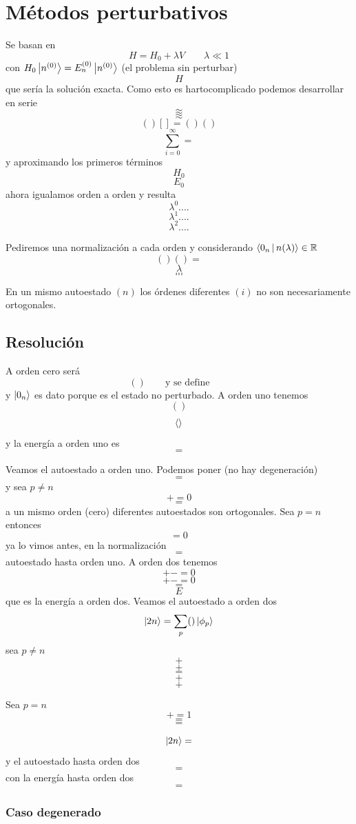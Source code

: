 \documentclass[10pt,oneside]{CBFT_book}
\begin{document}
\chapter{Métodos perturbativos}

Se basan en 
\[
	H = H_0 + \lambda V \qquad \lambda \ll 1
\]
con $ H_0\Ket{n^{(0)}} = E_n^{(0)}\Ket{n^{(0)}}$ (el problema sin perturbar)
\[
	H
\]
que sería la solución exacta.
Como esto es hartocomplicado podemos desarrollar en serie 
\[
	\approx 
\]
\[
	\approx 
\]
\[
	()[] = ()()
\]
\[
	\sum_{i=0}^\infty =
\]
y aproximando los primeros términos 
\[
	H_0
\]
\[
	E_0
\]
ahora igualamos orden a orden y resulta 
\[
	\lambda^0 ....
\]
\[
	\lambda^1 ....
\]
\[
	\lambda^2 ....
\]

Pediremos una normalización a cada orden y considerando $ \Braket{0_n|n(\lambda)} \in \mathbb{R}$
\[
	()() =
\]
\[
	\lambda
\]
\[
	...
\]
\[
	...
\]

En un mismo autoestado $(n)$ los órdenes diferentes $(i)$ no son necesariamente ortogonales.

\section{Resolución}

A orden cero será 
\[
	() \qquad \text{y se define} \qquad 
\]
y $\Ket{0_n}$ es dato porque es el estado no perturbado.
A orden uno tenemos 
\[
	()
\]
\[
	\Braket{}
\]
y la energía a orden uno es 
\[
	=
\]

Veamos el autoestado a orden uno. Podemos poner (no hay degeneración)
\[
	=
\]
y sea $p\neq n$
\[
	+ = 0
\]
\[
	=
\]
a un mismo orden (cero) diferentes autoestados son ortogonales.
Sea $p=n$ entonces 
\[
	= 0 
\]
ya lo vimos antes, en la normalización
\[
	=
\]
autoestado hasta orden uno. A orden dos tenemos 
\[
	+ - = 0
\]
\[
	+ - = 0
\]
\[
	=
\]
\[
	E
\]
que es la energía a orden dos.
Veamos el autoestado a orden dos 
\[
	\Ket{2n} = \sum_p ()\Ket{\phi_p}
\]
sea $p\neq n$ 
\[
	+
\]
\[
	+
\]
\[
	=
\]
\[
	+
\]
\[
	+
\]

Sea $p=n$
\[
	+ = 1
\]
\[
	=
\]
\[
	=
\]

\[
	\Ket{2n} =
\]
y el autoestado hasta orden dos
\[
	=
\]
con la energía hasta orden dos 
\[
	=
\]

\subsection{Caso degenerado}
\end{document}
